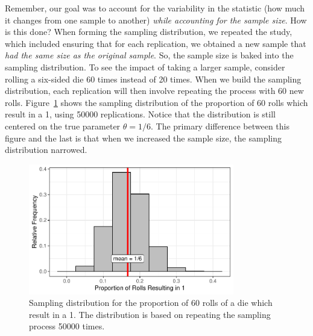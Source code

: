 \documentclass[
  letterpaper,
  DIV=11,
  numbers=noendperiod]{scrreprt}
\theoremstyle{plain}
\theoremstyle{definition}
\theoremstyle{definition}
\theoremstyle{remark}
\begin{document}
Remember, our goal was to account for the variability in the statistic
(how much it changes from one sample to another) \emph{while accounting
for the sample size}. How is this done? When forming the sampling
distribution, we repeated the study, which included ensuring that for
each replication, we obtained a new sample that \emph{had the same size
as the original sample}. So, the sample size is baked into the sampling
distribution. To see the impact of taking a larger sample, consider
rolling a six-sided die 60 times instead of 20 times. When we build the
sampling distribution, each replication will then involve repeating the
process with 60 new rolls.
Figure~\ref{fig-samplingdistns-dice-histogram2} shows the sampling
distribution of the proportion of 60 rolls which result in a 1, using
50000 replications. Notice that the distribution is still centered on
the true parameter \(\theta = 1/6\). The primary difference between this
figure and the last is that when we increased the sample size, the
sampling distribution narrowed.

\begin{figure}

{\centering \includegraphics[width=0.8\textwidth,height=\textheight]{./images/fig-samplingdistns-dice-histogram2-1.pdf}

}

\caption{\label{fig-samplingdistns-dice-histogram2}Sampling distribution
for the proportion of 60 rolls of a die which result in a 1. The
distribution is based on repeating the sampling process 50000 times.}

\end{figure}
\end{document}

